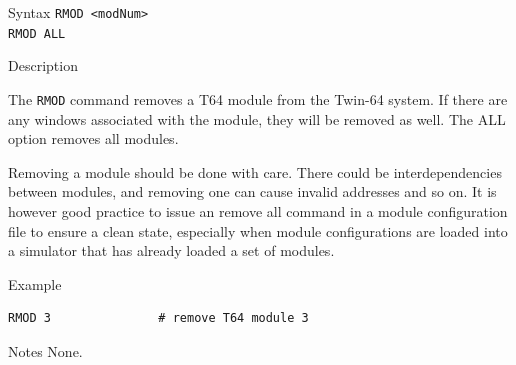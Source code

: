 %
%
\pagebreak
{}

\begin{iPageDescEntry}{Syntax}
\texttt{RMOD <modNum> } \\
\texttt{RMOD ALL} \\
\end{iPageDescEntry}

\begin{iPageDescEntry}{Description}

The \texttt{RMOD} command removes a T64 module from the Twin-64 system. If there are any windows associated with the module, they will be removed as well. The ALL option removes all modules.

Removing a module should be done with care. There could be interdependencies between modules, and removing one can cause invalid addresses and so on. It is however good practice to issue an remove all command in a module configuration file to ensure a clean state, especially when module configurations are loaded into a simulator that has already loaded a set of modules. 

\end{iPageDescEntry}

\begin{iPageDescOpEntry}{Example}

\begin{lstlisting}[style=iPageOpStyle]
RMOD 3               # remove T64 module 3
\end{lstlisting}
\end{iPageDescOpEntry}

\begin{iPageDescEntry}{Notes}
None.
\end{iPageDescEntry}

